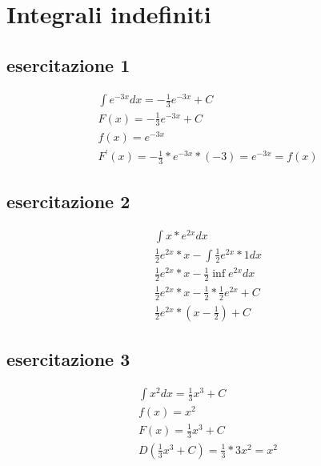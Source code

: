 \section{Integrali indefiniti}
\subsection{esercitazione 1}
	\begin{equation}
		\begin{matrix}
			\int e^{-3x}dx=-\frac{1}{3}e^{-3x}+C \\
			F(x)=-\frac{1}{3}e^{-3x}+C \\
			f(x)=e^{-3x}\\
			F^\prime(x)=-\frac{1}{3}*e^{-3x}*(-3)=e^{-3x}=f(x)
		\end{matrix}
	\end{equation}
\subsection{esercitazione 2}
	\begin{equation}
		\begin{matrix}
			\int x*e^{2x}dx\\
			\frac{1}{2}e^{2x}*x-\int\frac{1}{2}e^{2x}*1dx\\
			\frac{1}{2}e^{2x}*x-\frac{1}{2}\inf e^{2x}dx \\
			\frac{1}{2}e^{2x}*x-\frac{1}{2}*\frac{1}{2}e^{2x}+C\\
			\frac{1}{2}e^{2x}*\left( x-\frac{1}{2}\right)+C
		\end{matrix}
	\end{equation}
\subsection{esercitazione 3}
	\begin{equation}
		\begin{matrix}
			\int x^2dx=\frac{1}{3}x^3+C\\
			f(x)=x^2\\
			F(x)=\frac{1}{3}x^3+C\\
			D\left(\frac{1}{3}x^3+C\right)=\frac{1}{3}*3x^2=x^2
		\end{matrix}
	\end{equation}
